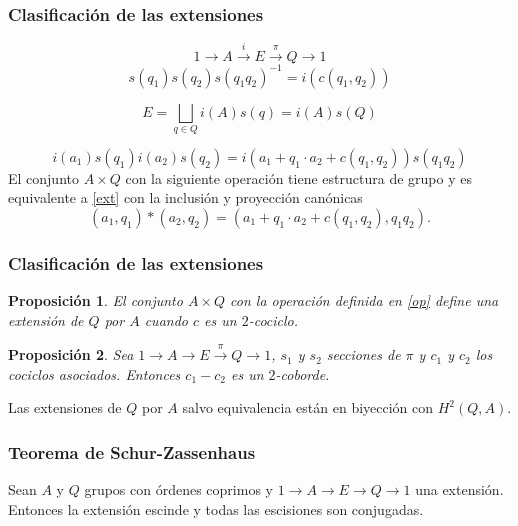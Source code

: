 \documentclass[
	11pt, %
]{beamer}
\newcommand{\extension}[5]{1\xrightarrow{} #3 \xrightarrow{#1} #4\xrightarrow{#2} #5 \xrightarrow{} 1}
\newtheorem{proposition}{Proposici\'on}
\begin{document}
\begin{frame}
	\frametitle{Clasificación de las extensiones}
	
	\begin{equation}\label{ext}
		\extension i \pi A E Q
	\end{equation}
	\begin{equation*}
		s(q_1)s(q_2)s(q_1q_2)^{-1} = i(c(q_1,q_2))
	\end{equation*}
	
	$$	
		E = \bigsqcup_{q\in Q} i(A)s(q) = i(A)s(Q)
	$$
	
	$$
		i(a_1)s(q_1)i(a_2)s(q_2) = %
		i(a_1+q_1\cdot a_2 + c(q_1,q_2))s(q_1q_2)
	$$
	El conjunto $A\times Q$ con la siguiente operación tiene estructura de grupo y es equivalente a \eqref{ext} con la inclusión y proyección canónicas
	\begin{equation}\label{op}
		(a_1,q_1)*(a_2,q_2) = (a_1+q_1\cdot a_2 + c(q_1,q_2),q_1q_2). 
	\end{equation}
\end{frame}

\begin{frame}
	\frametitle{Clasificación de las extensiones}
	\begin{proposition}
		El conjunto $A\times Q$ con la operación definida en \eqref{op} define una extensión de $Q$ por $A$ cuando $c$ es un $2$-cociclo.
	\end{proposition}
	
	\begin{proposition}
		Sea $\extension {}{\pi} A E Q$, $s_1$ y $s_2$ secciones de $\pi$ y $c_1$ y $c_2$ los cociclos asociados. Entonces $c_1-c_2$ es un $2$-coborde. 
	\end{proposition}
	
	\begin{theorem}
		Las extensiones de $Q$ por $A$ salvo equivalencia están en biyección con $H^2(Q,A)$.
	\end{theorem}	
\end{frame}

\begin{frame}
	\frametitle{Teorema de Schur-Zassenhaus}
	\begin{theorem}
		Sean $A$ y $Q$ grupos con órdenes coprimos y $\extension {}{} A E Q$ una extensión. Entonces la extensión escinde y todas las escisiones son conjugadas.
	\end{theorem}
\end{frame}
\end{document}
